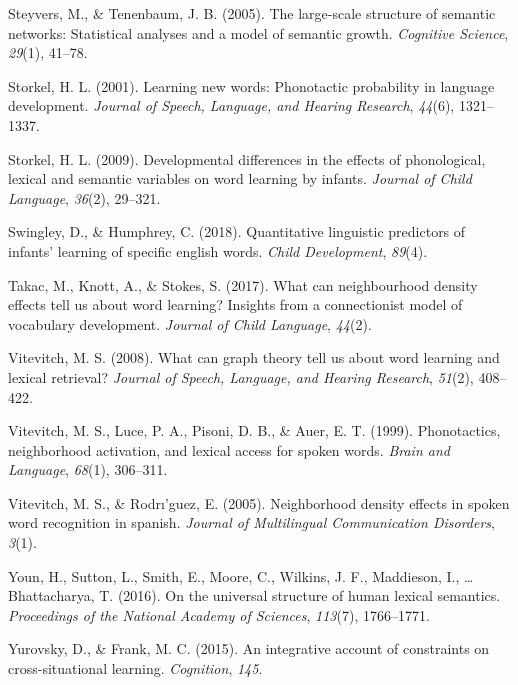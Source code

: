 \documentclass[english,,man,floatsintext]{apa6}
\begin{document}
\leavevmode\hypertarget{ref-steyvers2005}{}%
Steyvers, M., \& Tenenbaum, J. B. (2005). The large-scale structure of semantic networks: Statistical analyses and a model of semantic growth. \emph{Cognitive Science}, \emph{29}(1), 41--78.

\leavevmode\hypertarget{ref-storkel2001}{}%
Storkel, H. L. (2001). Learning new words: Phonotactic probability in language development. \emph{Journal of Speech, Language, and Hearing Research}, \emph{44}(6), 1321--1337.

\leavevmode\hypertarget{ref-storkel2009}{}%
Storkel, H. L. (2009). Developmental differences in the effects of phonological, lexical and semantic variables on word learning by infants. \emph{Journal of Child Language}, \emph{36}(2), 29--321.

\leavevmode\hypertarget{ref-swingley2018}{}%
Swingley, D., \& Humphrey, C. (2018). Quantitative linguistic predictors of infants' learning of specific english words. \emph{Child Development}, \emph{89}(4).

\leavevmode\hypertarget{ref-takac2017}{}%
Takac, M., Knott, A., \& Stokes, S. (2017). What can neighbourhood density effects tell us about word learning? Insights from a connectionist model of vocabulary development. \emph{Journal of Child Language}, \emph{44}(2).

\leavevmode\hypertarget{ref-vitevitch2008}{}%
Vitevitch, M. S. (2008). What can graph theory tell us about word learning and lexical retrieval? \emph{Journal of Speech, Language, and Hearing Research}, \emph{51}(2), 408--422.

\leavevmode\hypertarget{ref-vitevitch1999}{}%
Vitevitch, M. S., Luce, P. A., Pisoni, D. B., \& Auer, E. T. (1999). Phonotactics, neighborhood activation, and lexical access for spoken words. \emph{Brain and Language}, \emph{68}(1), 306--311.

\leavevmode\hypertarget{ref-vitevitch2005}{}%
Vitevitch, M. S., \& Rodrı'guez, E. (2005). Neighborhood density effects in spoken word recognition in spanish. \emph{Journal of Multilingual Communication Disorders}, \emph{3}(1).

\leavevmode\hypertarget{ref-youn2016}{}%
Youn, H., Sutton, L., Smith, E., Moore, C., Wilkins, J. F., Maddieson, I., \ldots{} Bhattacharya, T. (2016). On the universal structure of human lexical semantics. \emph{Proceedings of the National Academy of Sciences}, \emph{113}(7), 1766--1771.

\leavevmode\hypertarget{ref-yurovsky2015}{}%
Yurovsky, D., \& Frank, M. C. (2015). An integrative account of constraints on cross-situational learning. \emph{Cognition}, \emph{145}.
\end{document}
